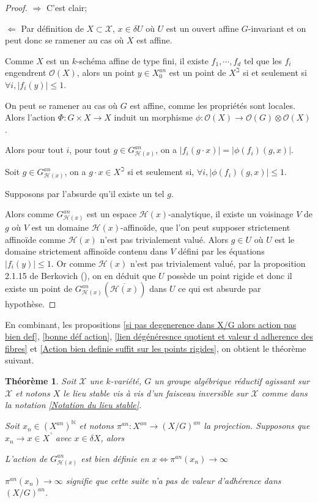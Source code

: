 \documentclass[11pt]{article}
\newcommand{\N}{\mathbb{N}}
\newtheorem{thm}{Théorème}[section]
\begin{document}
\begin{proof}
$\Rightarrow$ C'est clair;

$\Leftarrow$ Par définition de $X \subset \mathcal{X}$, $x\in \delta U$ où $U$ est un ouvert affine $G$-invariant et on peut donc se ramener au cas où $X$ est affine.

Comme $X$ est un $k$-schéma affine de type fini, il existe $f_1, \cdots, f_d$ tel que les $f_i$ engendrent $\mathcal{O}(X)$, alors un point $y\in X_0^{an}$ est un point de $X^\beth$ si et seulement si $\forall i, |f_i(y)| \leq 1$. 

On peut se ramener au cas où $G$ est affine, comme les propriétés sont locales. Alors l'action $\Phi :G \times X \rightarrow X$ induit un morphisme $\phi : \mathcal{O}(X) \rightarrow \mathcal{O}(G)\otimes \mathcal{O}(X)$. 

Alors pour tout $i$, pour tout $g \in G_{ \mathcal{H}(x)}^{an}$, on a $|f_i(g\cdot x)| = |\phi(f_i)(g,x)|.$

Soit  $g\in G_{ \mathcal{H}(x)}^{an}$, on a $g\cdot x \in X^\beth$ si et seulement si, $\forall i, |\phi(f_i)(g,x)|\leq 1$.

Supposons par l'absurde qu'il existe un tel $g$. 

Alors comme $G^{an}_{\mathcal{H}(x)}$ est un espace $\mathcal{H}(x)$-analytique, il existe un  voisinage $V$ de $g$ où $V$ est un domaine $\mathcal{H}(x)$-affinoïde, que l'on peut supposer strictement affinoïde comme $\mathcal{H}(x)$ n'est pas trivialement valué. Alors $g \in U$ où $U$ est le domaine strictement affinoïde contenu dans $V$ défini par les équations $|f_i(y)|\leq 1$. Or comme $\mathcal{H}(x)$ n'est pas trivialement valué, par la proposition 2.1.15 de Berkovich (\cite{BerkovichLivre}), on en déduit que $U$ possède un point rigide et donc il existe un point de $G^{an}_{\mathcal{H}(x)}(\overline{\mathcal{H}(x)})$ dans $U$ ce qui est absurde par hypothèse.
\end{proof}

En combinant, les propositions \ref{si pas degenerence dans X/G alors action pas bien def}, \ref{bonne déf action}, \ref{lien dégénéresnce quotient et valeur d adherence des fibres} et \ref{Action bien definie suffit sur les points rigides}, on obtient le théorème suivant.

\begin{thm}\label{equivalence dégénérecence quotient et action bien déf}
Soit $\mathcal{X}$ une $k$-variété, $G$ un groupe algébrique réductif agissant sur $\mathcal{X}$ et notons $X$ le lieu stable vis à vis d'un faisceau inversible sur $\mathcal{X}$ comme dans la notation \ref{Notation du lieu stable}.

Soit $x_n \in (X^{an})^\N$ et notons $\pi^{an} : X^{an} \rightarrow (X/G)^{an}$ la projection. Supposons que $x_n \rightarrow x \in X^\urcorner$ avec $x\in \delta X$, alors
\begin{center}
L'action de $G_{\mathcal{H}(x)}^{an}$ est bien définie en $x \iff \pi^{an}(x_n) \rightarrow \infty$
\end{center} 
$\pi^{an}(x_n) \rightarrow \infty$ signifie que cette suite n'a pas de valeur d'adhérence dans $(X/G)^{an}$.
\end{thm}
\end{document}
